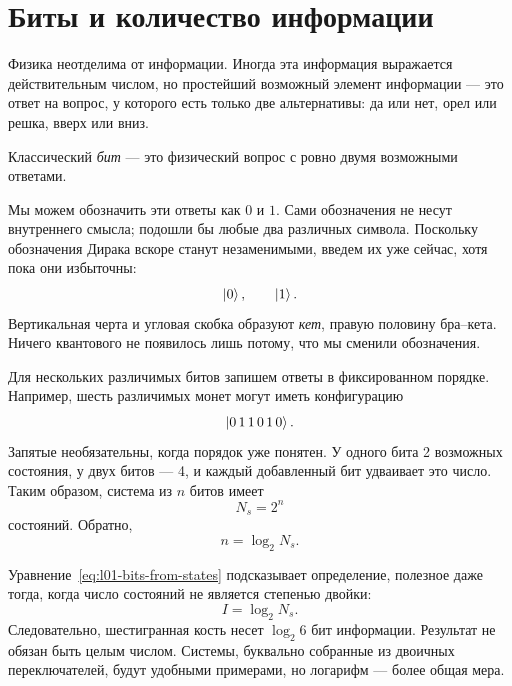 \section{Биты и количество информации}

Физика неотделима от информации. Иногда эта информация выражается действительным числом, но простейший возможный элемент информации — это ответ на вопрос, у которого есть только две альтернативы: да или нет, орел или решка, вверх или вниз.

\begin{definition}
Классический \emph{бит} — это физический вопрос с ровно двумя возможными ответами.
\end{definition}

Мы можем обозначить эти ответы как \(0\) и \(1\). Сами обозначения не несут внутреннего смысла; подошли бы любые два различных символа. Поскольку обозначения Дирака вскоре станут незаменимыми, введем их уже сейчас, хотя пока они избыточны:
\begin{equation}
  \left\lvert0\right\rangle,
  \qquad
  \left\lvert1\right\rangle.
\end{equation}
Вертикальная черта и угловая скобка образуют \emph{кет}, правую половину бра--кета. Ничего квантового не появилось лишь потому, что мы сменили обозначения.

Для нескольких различимых битов запишем ответы в фиксированном порядке. Например, шесть различимых монет могут иметь конфигурацию
\begin{equation}
  \left\lvert0\,1\,1\,0\,1\,0\right\rangle.
\end{equation}
Запятые необязательны, когда порядок уже понятен. У одного бита 2 возможных состояния, у двух битов — 4, и каждый добавленный бит удваивает это число. Таким образом, система из \(n\) битов имеет
\begin{equation}
  N_s=2^n
  \label{eq:l01-state-count}
\end{equation}
состояний. Обратно,
\begin{equation}
  n=\log_2 N_s.
  \label{eq:l01-bits-from-states}
\end{equation}

Уравнение~\eqref{eq:l01-bits-from-states} подсказывает определение, полезное даже тогда, когда число состояний не является степенью двойки:
\begin{equation}
  I=\log_2 N_s.
  \label{eq:l01-information}
\end{equation}
Следовательно, шестигранная кость несет \(\log_2 6\) бит информации. Результат не обязан быть целым числом. Системы, буквально собранные из двоичных переключателей, будут удобными примерами, но логарифм — более общая мера.

